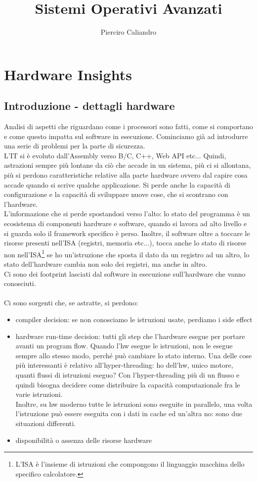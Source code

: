 \documentclass[12pt, oneside]{extbook}
\title{Sistemi Operativi Avanzati}
\author{Pierciro Caliandro}
\begin{document}
\maketitle
\tableofcontents
\chapter{Hardware Insights}
\section{Introduzione - dettagli hardware}
Analisi di aspetti che riguardano come i processori sono fatti, come si comportano e come questo impatta sul software in esecuzione. Cominciamo già ad introdurre una serie di problemi per la parte di sicurezza.\\ L'IT si è evoluto dall'Assembly verso B/C, C++, Web API etc... Quindi, astrazioni sempre più lontane da ciò che accade in un sistema, più ci si allontana, più si perdono caratteristiche relative alla parte hardware ovvero dal capire cosa accade quando si scrive qualche applicazione. Si perde anche la capacità di configurazione e la capacità di sviluppare nuove cose, che si scontrano con l'hardware.\\ L'informazione che si perde spostandosi verso l'alto: lo stato del programma è un ecosistema di componenti hardware e software, quando si lavora ad alto livello e si guarda solo il framework specifico è perso. Inoltre, il software oltre a toccare le risorse presenti nell'ISA (registri, memoria etc...), tocca anche lo stato di risorse non nell'ISA\footnote{L'ISA è l'insieme di istruzioni che compongono il linguaggio macchina dello specifico calcolatore.} se ho un'istruzione che sposta il dato da un registro ad un altro, lo stato dell'hardware cambia non solo dei registri, ma anche in altro.\\ Ci sono dei footprint lasciati dal software in esecuzione sull'hardware che vanno conosciuti.\\\\ Ci sono sorgenti che, se astratte, si perdono:
\begin{itemize}
\item compiler decision: se non conosciamo le istruzioni usate, perdiamo i side effect
\item hardware run-time decision: tutti gli step che l'hardware esegue per portare avanti un program flow. Quando l'hw esegue le istruzioni, non le esegue sempre allo stesso modo, perché può cambiare lo stato interno. Una delle cose più interessanti è relativo all'hyper-threading: ho dell'hw, unico motore, quanti flussi di istruzioni eseguo? Con l'hyper-threading più di un flusso e quindi bisogna decidere come distribuire la capacità computazionale fra le varie istruzioni. \\ Inoltre, su hw moderno tutte le istruzioni sono eseguite in parallelo, una volta l'istruzione può essere eseguita con i dati in cache ed un'altra no: sono due situazioni differenti.
\item disponibilità o assenza delle risorse hardware
\end{itemize}
\end{document}
